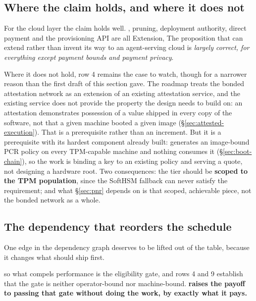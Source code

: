 \subsection{Where the claim holds, and where it does not}

For the cloud layer the claim holds well. , pruning, deployment authority, direct payment and
the provisioning API are all Extension, 
The proposition that \Flux can extend rather than invent its way to an agent-serving cloud is
\emph{largely correct, for everything except payment bounds and payment privacy}.

Where it does not hold, row 4 remains the case to watch, though for a narrower reason than the
first draft of this section gave. The roadmap treats the bonded attestation network as an extension of
an existing attestation service, and the existing service does not provide the property the design
needs to build on: an attestation demonstrates possession of a value shipped in every copy of the
software, not that a given machine booted a given image (\S\ref{sec:attested-execution}). That is a
prerequisite rather than an increment. But it is a prerequisite with its hardest component already
built: \ArcaneOS{} generates an image-bound PCR policy on every TPM-capable machine and nothing
consumes it (\S\ref{sec:boot-chain}), so the work is binding a key to an existing policy and serving a
quote, not designing a hardware root. Two consequences: the tier should be \textbf{scoped to the TPM
population}, since the SoftHSM fallback can never satisfy the requirement; and what \S\ref{sec:pnr}
depends on is that scoped, achievable piece, not the bonded network as a whole.

\subsection{The dependency that reorders the schedule}

One edge in the dependency graph deserves to be lifted out of the table, because it changes what
should ship first.

  so what compels performance
is the eligibility gate, and rows 4 and 9 establish that the gate is neither operator-bound nor
machine-bound. \textbf{\PNR raises the payoff to passing that gate without doing the work, by exactly
what it pays.}

